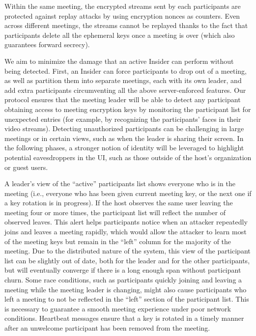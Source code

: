 Within the same meeting, the encrypted streams sent by each participants are protected against
replay attacks by using encryption nonces as counters. Even across different meetings, the streams
cannot be replayed thanks to the fact that participants delete all the ephemeral keys once a meeting
is over (which also guarantees forward secrecy). 

We aim to minimize the damage that an active Insider can perform without being detected. First, an
Insider can force participants to drop out of a meeting, as well as partition them into separate
meetings, each with its own leader, and add extra participants circumventing all the above
server-enforced features. Our protocol ensures that the meeting leader will be able to detect any
participant obtaining access to meeting encryption keys by monitoring the participant list for
unexpected entries (for example, by recognizing the participants' faces in their video streams).
Detecting unauthorized participants can be challenging in large meetings or in certain views, such
as when the leader is sharing their screen. In the following phases, a stronger notion of identity
will be leveraged to highlight potential eavesdroppers in the UI, such as those outside of the
host's organization or guest users.

A leader's view of the ``active'' participants list shows everyone who is in the meeting (i.e.,
everyone who has been given current meeting key, or the next one if a key rotation is in progress).
If the host observes the same user leaving the meeting four or more times, the participant list will
reflect the number of observed leaves. This alert helps participants notice when an attacker
repeatedly joins and leaves a meeting rapidly, which would allow the attacker to learn most of the
meeting keys but remain in the ``left'' column for the majority of the meeting. Due to the
distributed nature of the system, this view of the participant list can be slightly out of date,
both for the leader and for the other participants, but will eventually converge if there is a long
enough span without participant churn. Some race conditions, such as participants quickly joining
and leaving a meeting while the meeting leader is changing, might also cause participants who left a
meeting to not be reflected in the ``left'' section of the participant list. This is necessary to
guarantee a smooth meeting experience under poor network conditions. Heartbeat messages ensure that
a key is rotated in a timely manner after an unwelcome participant has been removed from the
meeting.

